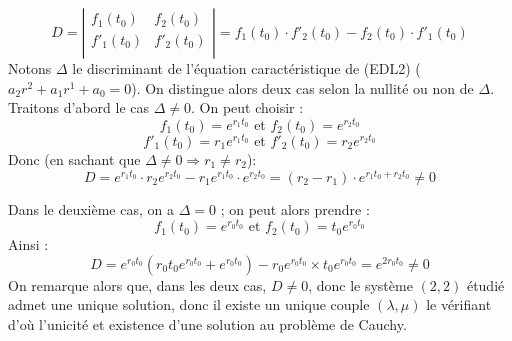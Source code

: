 \documentclass{article}
\begin{document}
\begin{question_kholle}
 	$$D = \left|
 	\begin{array}{cc}
 		f_{1}(t_{0})  & f_{2}(t_{0})  \\
 		f'_{1}(t_{0}) & f'_{2}(t_{0}) \\
 	\end{array}
 	\right| = f_{1}(t_{0}) \cdot f'_{2}(t_{0}) - f_{2}(t_{0}) \cdot f'_{1}(t_{0}) $$
 	Notons $\Delta$ le discriminant de l'équation caractéristique de (EDL2) ($a_{2}r^{2} + a_{1}r^{1} + a_{0} = 0$). On distingue alors deux cas selon la nullité ou non de $\Delta$. Traitons d'abord le cas $\Delta \neq 0$. On peut choisir :
 	$$ f_{1}(t_{0}) = e^{r_{1}t_{0}} \text{ et } f_{2}(t_{0}) = e^{r_{2}t_{0}}$$
 	$$ f'_{1}(t_{0}) = r_{1}e^{r_{1}t_{0}} \text{ et } f'_{2}(t_{0}) = r_{2}e^{r_{2}t_{0}}$$
 	Donc (en sachant que $\Delta \neq 0 \Rightarrow r_{1} \neq r_{2}$):
 	$$ D = e^{r_{1}t_{0}} \cdot r_{2}e^{r_{2}t_{0}} - r_{1}e^{r_{1}t_{0}} \cdot e^{r_{2}t_{0}} = (r_{2} - r_{1}) \cdot e^{r_{1}t_{0} + r_{2}t_{0}} \neq 0$$
 	
 	Dans le deuxième cas, on a $\Delta = 0$ ; on peut alors prendre :
 	$$ f_{1}(t_{0}) = e^{r_{0}t_{0}} \text{ et } f_{2}(t_{0}) = t_{0}e^{r_{0}t_{0}}$$
 	Ainsi :
 	$$ D = e^{r_{0}t_{0}} \left(r_{0}t_{0}e^{r_{0}t_{0}} + e^{r_{0}t_{0}} \right) - r_{0}e^{r_{0}t_{0}} \times t_{0}e^{r_{0}t_{0}} = e^{2r_{0}t_{0}} \neq 0$$
 	On remarque alors que, dans les deux cas, $D \neq 0$, donc le système $(2, 2)$ étudié admet une unique solution, donc il existe un unique couple $(\lambda, \mu)$ le vérifiant d'où l'unicité et existence d'une solution au problème de Cauchy.
 	\newline\newline
 	

\end{question_kholle}
\end{document}
